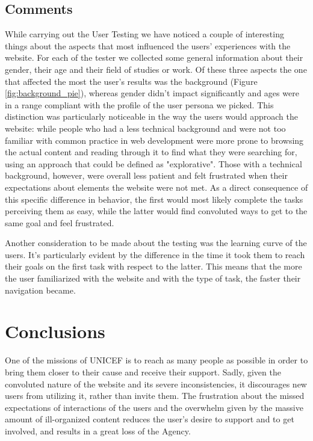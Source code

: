 \subsection{Comments}
While carrying out the User Testing we have noticed a couple of interesting things about the aspects that most influenced the users' experiences with the website. For each of the tester we collected some general information
about their gender, their age and their field of studies or work. Of these three aspects the one that affected the most the user's results was the background (Figure \ref{fig:background_pie}), whereas gender didn't impact significantly and ages were in a range compliant with the profile of the user persona we picked.
This distinction was particularly noticeable in the way the users would approach the website: while people who had a less technical background and were not too familiar with common practice in web development were more prone to browsing the actual content and reading through it to find what they were searching for, using an approach that could be defined as "explorative". Those with a technical background, however, were overall less patient and felt frustrated when their expectations about elements the website were not met.
As a direct consequence of this specific difference in behavior, the first would most likely complete the tasks perceiving them as easy, while the latter would find convoluted ways to get to the same goal and feel frustrated.

Another consideration to be made about the testing was the learning curve of the users. It's particularly evident by the difference in the time it took them to reach their goals on the first task with respect to the latter.
This means that the more the user familiarized with the website and with the type of task, the faster their navigation became.

\section{Conclusions}
One of the missions of UNICEF is to reach as many people as possible in order to bring them closer to their cause and receive their support. Sadly, given the convoluted nature of the website and its severe inconsistencies, it discourages new users from utilizing it, rather than invite them.
The frustration about the missed expectations of interactions of the users and the overwhelm given by the massive amount of ill-organized content reduces the user's desire to support and to get involved, and results in a great loss of the Agency.
